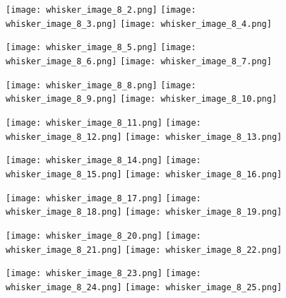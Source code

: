 \documentclass[12pt]{article}
\begin{document}
\begin{figure}
	\centerline{
		\texttt{[image: whisker\_image\_8\_2.png]}
		\texttt{[image: whisker\_image\_8\_3.png]}
		\texttt{[image: whisker\_image\_8\_4.png]}
	}
	\centerline{
		\texttt{[image: whisker\_image\_8\_5.png]}
		\texttt{[image: whisker\_image\_8\_6.png]}
		\texttt{[image: whisker\_image\_8\_7.png]}
	}
	\centerline{
		\texttt{[image: whisker\_image\_8\_8.png]}
		\texttt{[image: whisker\_image\_8\_9.png]}
		\texttt{[image: whisker\_image\_8\_10.png]}
	}
	\centerline{
		\texttt{[image: whisker\_image\_8\_11.png]}
		\texttt{[image: whisker\_image\_8\_12.png]}
		\texttt{[image: whisker\_image\_8\_13.png]}
	}
\end{figure}

\begin{figure}
	\centerline{
		\texttt{[image: whisker\_image\_8\_14.png]}
		\texttt{[image: whisker\_image\_8\_15.png]}
		\texttt{[image: whisker\_image\_8\_16.png]}
	}
	\centerline{
		\texttt{[image: whisker\_image\_8\_17.png]}
		\texttt{[image: whisker\_image\_8\_18.png]}
		\texttt{[image: whisker\_image\_8\_19.png]}
	}
	\centerline{
		\texttt{[image: whisker\_image\_8\_20.png]}
		\texttt{[image: whisker\_image\_8\_21.png]}
		\texttt{[image: whisker\_image\_8\_22.png]}
	}
	\centerline{
		\texttt{[image: whisker\_image\_8\_23.png]}
		\texttt{[image: whisker\_image\_8\_24.png]}
		\texttt{[image: whisker\_image\_8\_25.png]}
	}
\end{figure}
\end{document}
